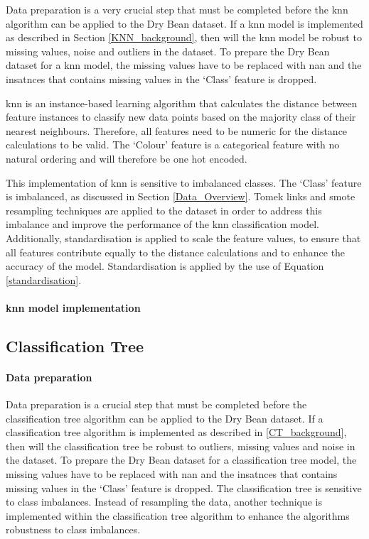 \documentclass[10pt, conference]{IEEEtran}
\begin{document}
Data preparation is a very crucial step that must be completed before the \acrshort{knn} algorithm can be applied to the Dry
Bean dataset. If a \acrshort{knn} model is implemented as described in Section \ref{KNN_background}, then
will the \acrshort{knn} model be robust to missing values, noise and outliers in the dataset. To prepare
the Dry Bean dataset for a \acrshort{knn} model, the missing values have to be replaced with \acrshort{nan}
and the insatnces that contains missing values in the `Class' feature is dropped.

\acrshort{knn} is an instance-based learning algorithm that calculates the distance between feature
instances to classify new data points based on the majority class of their nearest neighbours. Therefore, all features need
to be numeric for the distance calculations to be valid. The `Colour' feature is a categorical feature with no
natural ordering and will therefore be one hot encoded.

This implementation of \acrshort{knn} is sensitive to imbalanced classes. The `Class' feature is imbalanced, as
discussed in Section \ref{Data_Overview}. Tomek links and \acrshort{smote} resampling techniques are applied to the
dataset in order to address this imbalance and improve the performance of the \acrshort{knn} classification model.
Additionally, standardisation is applied to scale the feature values, to ensure that all features contribute
equally to the distance calculations and to enhance the accuracy of the model. Standardisation is applied
by the use of Equation \eqref{standardisation}.

\paragraph{\acrshort{knn} model implementation}



\subsection{Classification Tree}

\paragraph{Data preparation}

Data preparation is a crucial step that must be completed before the classification tree algorithm can be applied to the
Dry Bean dataset. If a classification tree algorithm is implemented as described in \ref{CT_background}, then will
the classification tree be robust to outliers, missing values and noise in the dataset.
To prepare the Dry Bean dataset for a classification tree model, the missing values have to be replaced
with \acrshort{nan} and the insatnces that contains missing values in the `Class' feature is dropped. The
classification tree is sensitive to class imbalances. Instead of resampling the data, another technique is implemented
within the classification tree algorithm to enhance the algorithms robustness to class imbalances.
\end{document}

